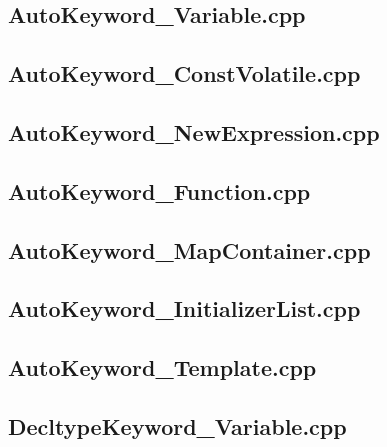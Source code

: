 \documentclass[11pt]{report}
\begin{document}
\begin{appendix}
\subsection{AutoKeyword\_Variable.cpp}
\label{AutoKeyword_Variable}


\subsection{AutoKeyword\_ConstVolatile.cpp}
\label{AutoKeyword_ConstVolatile}


\subsection{AutoKeyword\_NewExpression.cpp}
\label{AutoKeyword_NewExpression}


\subsection{AutoKeyword\_Function.cpp}
\label{AutoKeyword_Function}


\subsection{AutoKeyword\_MapContainer.cpp}
\label{AutoKeyword_MapContainer}


\subsection{AutoKeyword\_InitializerList.cpp}
\label{AutoKeyword_InitializerList}


\subsection{AutoKeyword\_Template.cpp}
\label{AutoKeyword_Template}


\subsection{DecltypeKeyword\_Variable.cpp}
\label{DecltypeKeyword_Variable}



\end{appendix}
\end{document}
